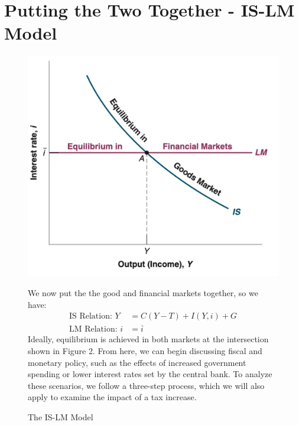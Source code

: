 \documentclass{extarticle}
\begin{document}
\section{Putting the Two Together - IS-LM Model}

\begin{figure}[H] 
  \centering %
  \begin{minipage}{0.4\linewidth} 
    \centering 
    \includegraphics[width=\linewidth]{IS-LM.png} 
    \caption{The IS-LM Model} 
    \label{fig:IS-LM} 
  \end{minipage}%
  \begin{minipage}{0.6\linewidth} 
    We now put the the good and financial markets together, so we have: 
    \begin{align*} 
      \text{IS Relation: } Y &= C(Y-T) + I(Y, i) + G \\ 
      \text{LM Relation: } i &= \overline{i} 
    \end{align*} 
    Ideally, equilibrium is achieved in both markets at the intersection shown in Figure 2. From here, we can begin discussing fiscal and monetary policy, such as the effects of increased government spending or lower interest rates set by the central bank. To analyze these scenarios, we follow a three-step process, which we will also apply to examine the impact of a tax increase.
  \end{minipage} 
\end{figure}
\end{document}
